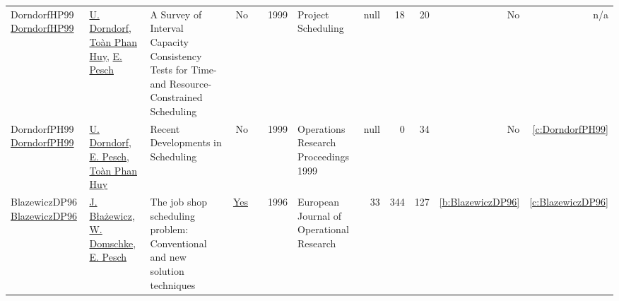 {\begin{longtable}{>{\raggedright\arraybackslash}p{3cm}>{\raggedright\arraybackslash}p{6cm}>{\raggedright\arraybackslash}p{6.5cm}rrrp{2.5cm}rrrrr}
DorndorfHP99 \href{http://dx.doi.org/10.1007/978-1-4615-5533-9_10}{DorndorfHP99} & \hyperref[auth:a922]{U. Dorndorf}, \hyperref[auth:a923]{Toàn Phan Huy}, \hyperref[auth:a445]{E. Pesch} & A Survey of Interval Capacity Consistency Tests for Time- and Resource-Constrained Scheduling & No & \cite{DorndorfHP99} & 1999 & Project Scheduling & null & 18 & 20 & No & n/a\\
DorndorfPH99 \href{http://dx.doi.org/10.1007/978-3-642-58409-1_35}{DorndorfPH99} & \hyperref[auth:a922]{U. Dorndorf}, \hyperref[auth:a445]{E. Pesch}, \hyperref[auth:a923]{Toàn Phan Huy} & Recent Developments in Scheduling & No & \cite{DorndorfPH99} & 1999 & Operations Research Proceedings 1999 & null & 0 & 34 & No & \ref{c:DorndorfPH99}\\
BlazewiczDP96 \href{http://dx.doi.org/10.1016/0377-2217(95)00362-2}{BlazewiczDP96} & \hyperref[auth:a998]{J. Błażewicz}, \hyperref[auth:a999]{W. Domschke}, \hyperref[auth:a445]{E. Pesch} & The job shop scheduling problem: Conventional and new solution techniques & \href{../works/BlazewiczDP96.pdf}{Yes} & \cite{BlazewiczDP96} & 1996 & European Journal of Operational Research & 33 & 344 & 127 & \ref{b:BlazewiczDP96} & \ref{c:BlazewiczDP96}\\
\end{longtable}
}

\clearpage
